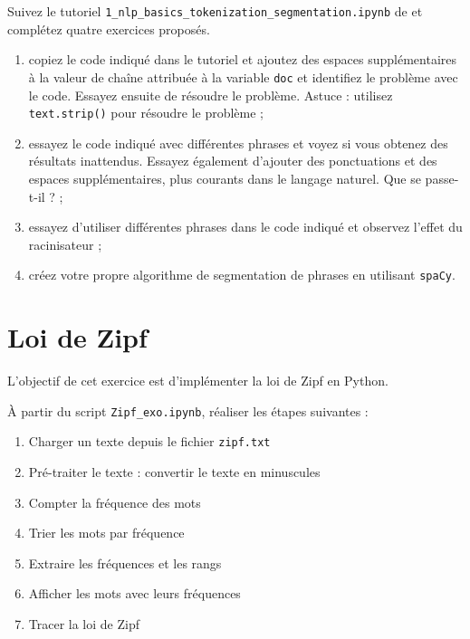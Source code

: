 \documentclass[xcolor={table,usenames,dvipsnames}]{article}
\begin{document}
	Suivez le tutoriel \texttt{1\_nlp\_basics\_tokenization\_segmentation.ipynb} de \textcite{saravia} et complétez quatre exercices proposés.
	\begin{enumerate}
		\item copiez le code indiqué dans le tutoriel et ajoutez des espaces supplémentaires à la valeur de chaîne attribuée à la variable \texttt{doc} et identifiez le problème avec le code. Essayez ensuite de résoudre le problème. Astuce : utilisez \texttt{text.strip()} pour résoudre le problème ;
		\item essayez le code indiqué avec différentes phrases et voyez si vous obtenez des résultats inattendus. Essayez également d'ajouter des ponctuations et des espaces supplémentaires, plus courants dans le langage naturel. Que se passe-t-il ? ;
		\item essayez d'utiliser différentes phrases dans le code indiqué et observez l'effet du racinisateur ;
		\item créez votre propre algorithme de segmentation de phrases en utilisant \texttt{spaCy}.
	\end{enumerate}
	
	\section{Loi de Zipf}  %
	
	L'objectif de cet exercice est d'implémenter la loi de Zipf en Python.
	
	\bigskip
	
	À partir du script \texttt{Zipf\_exo.ipynb}, réaliser les étapes suivantes :
	\begin{enumerate}
		\item Charger un texte depuis le fichier \texttt{zipf.txt}
		\item Pré-traiter le texte : convertir le texte en minuscules
		\item Compter la fréquence des mots
		\item Trier les mots par fréquence
		\item Extraire les fréquences et les rangs
		\item  Afficher les mots avec leurs fréquences
		\item Tracer la loi de Zipf
	\end{enumerate}
	

\printbibliography



	
\end{document}
